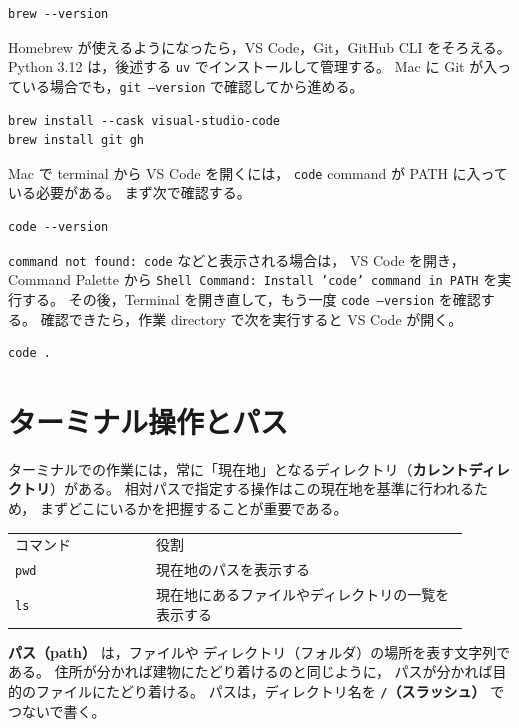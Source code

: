 \begin{lstlisting}[style=codecell]
brew --version
\end{lstlisting}

Homebrew が使えるようになったら，VS Code，Git，GitHub CLI をそろえる。
Python 3.12 は，後述する \texttt{uv} でインストールして管理する。
Mac に Git が入っている場合でも，\texttt{git --version} で確認してから進める。

\begin{lstlisting}[style=codecell]
brew install --cask visual-studio-code
brew install git gh
\end{lstlisting}

Mac で terminal から VS Code を開くには，
\texttt{code} command が PATH に入っている必要がある。
まず次で確認する。

\begin{lstlisting}[style=codecell]
code --version
\end{lstlisting}

\texttt{command not found: code} などと表示される場合は，
VS Code を開き，Command Palette から
\texttt{Shell Command: Install 'code' command in PATH} を実行する。
その後，Terminal を開き直して，もう一度 \texttt{code --version} を確認する。
確認できたら，作業 directory で次を実行すると VS Code が開く。

\begin{lstlisting}[style=codecell]
code .
\end{lstlisting}

\section{ターミナル操作とパス}

ターミナルでの作業には，常に「現在地」となるディレクトリ（\textbf{カレントディレクトリ}）がある。
相対パスで指定する操作はこの現在地を基準に行われるため，
まずどこにいるかを把握することが重要である。

\begin{center}
\begin{tabular}{p{0.28\linewidth}p{0.62\linewidth}}
\hline
コマンド & 役割 \\
\texttt{pwd} & 現在地のパスを表示する \\
\texttt{ls} & 現在地にあるファイルやディレクトリの一覧を表示する \\
\hline
\end{tabular}
\end{center}

\textbf{パス（path）} は，ファイルや
ディレクトリ（フォルダ）の場所を表す文字列である。
住所が分かれば建物にたどり着けるのと同じように，
パスが分かれば目的のファイルにたどり着ける。
パスは，ディレクトリ名を \textbf{\texttt{/}（スラッシュ）} でつないで書く。

